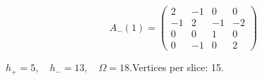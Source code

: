 \begin{minipage}{\linewidth}
\begin{minipage}[c]{0.495\linewidth}
\end{minipage}%
\begin{minipage}[c]{0.495\linewidth}\centering\fontsize{9.7}{12}\selectfont
\setlength{\abovedisplayskip}{4pt}\setlength{\belowdisplayskip}{4pt}
\setlength{\abovedisplayshortskip}{4pt}\setlength{\belowdisplayshortskip}{4pt}
\setlength{\arraycolsep}{3pt}\renewcommand{\arraystretch}{1.08}
\[A_{-}(1)=\begin{pmatrix}2 & -1 & 0 & 0\\-1 & 2 & -1 & -2\\0 & 0 & 1 & 0\\0 & -1 & 0 & 2\end{pmatrix}\]
\end{minipage}%
\par\smallskip\noindent\small $h_+=5,\quad h_-=13,\quad \Omega=18.$\quad Vertices per slice: 15.
\end{minipage}\par\vfill
